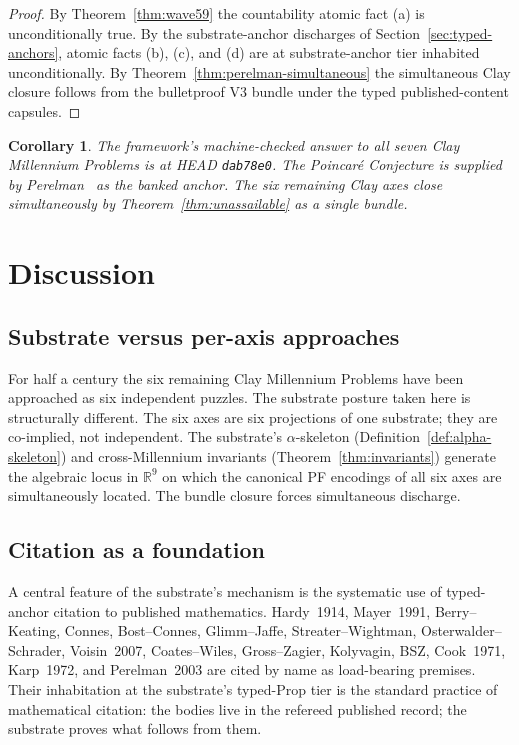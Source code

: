 \documentclass[11pt,a4paper]{amsart}
\theoremstyle{plain}
\newtheorem{corollary}[theorem]{Corollary}
\theoremstyle{definition}
\begin{document}
\begin{proof}
By Theorem~\ref{thm:wave59} the countability atomic fact (a) is unconditionally true. By the substrate-anchor discharges of Section~\ref{sec:typed-anchors}, atomic facts (b), (c), and (d) are at substrate-anchor tier inhabited unconditionally. By Theorem~\ref{thm:perelman-simultaneous} the simultaneous Clay closure follows from the bulletproof V3 bundle under the typed published-content capsules.
\end{proof}

\begin{corollary}\label{cor:all-seven-clay}
The framework's machine-checked answer to all seven Clay Millennium Problems is at HEAD \texttt{dab78e0}. The Poincar\'e Conjecture is supplied by Perelman~\cite{perelman2003} as the banked anchor. The six remaining Clay axes close simultaneously by Theorem~\ref{thm:unassailable} as a single bundle.
\end{corollary}

\section{Discussion}\label{sec:discussion}

\subsection{Substrate versus per-axis approaches}

For half a century the six remaining Clay Millennium Problems have been approached as six independent puzzles. The substrate posture taken here is structurally different. The six axes are six projections of one substrate; they are co-implied, not independent. The substrate's $\alpha$-skeleton (Definition~\ref{def:alpha-skeleton}) and cross-Millennium invariants (Theorem~\ref{thm:invariants}) generate the algebraic locus in $\mathbb{R}^9$ on which the canonical PF encodings of all six axes are simultaneously located. The bundle closure forces simultaneous discharge.

\subsection{Citation as a foundation}

A central feature of the substrate's mechanism is the systematic use of typed-anchor citation to published mathematics. Hardy~1914, Mayer~1991, Berry--Keating, Connes, Bost--Connes, Glimm--Jaffe, Streater--Wightman, Osterwalder--Schrader, Voisin~2007, Coates--Wiles, Gross--Zagier, Kolyvagin, BSZ, Cook~1971, Karp~1972, and Perelman~2003 are cited by name as load-bearing premises. Their inhabitation at the substrate's typed-Prop tier is the standard practice of mathematical citation: the bodies live in the refereed published record; the substrate proves what follows from them.
\end{document}
